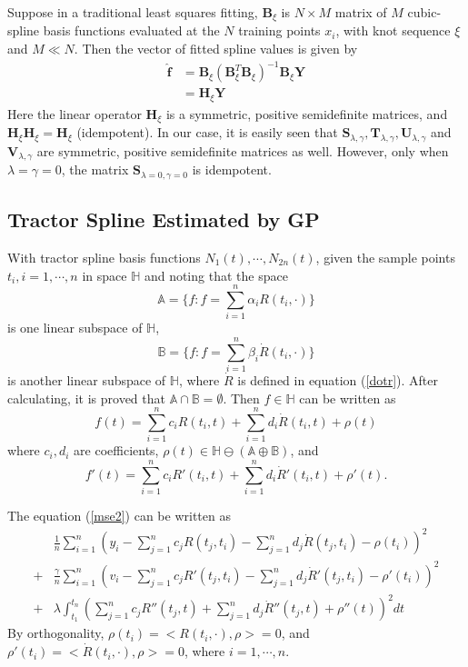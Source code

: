 Suppose in a traditional least squares fitting, $\mathbf{B}_\xi$ is $N \times M$ matrix of $M$ cubic-spline basis functions evaluated at the $N$ training points $x_i$, with knot sequence $\xi$ and $M \ll N$. Then the vector of fitted spline values is given by
\begin{align*}
\hat{\mathbf{f}}&=\mathbf{B}_\xi(\mathbf{B}^T_\xi\mathbf{B}_\xi)^{-1}\mathbf{B}_\xi\mathbf{Y}\\
&=\mathbf{H}_\xi\mathbf{Y}
\end{align*}
Here the linear operator $\mathbf{H}_\xi$ is a symmetric, positive semidefinite matrices, and $\mathbf{H}_\xi\mathbf{H}_\xi=\mathbf{H}_\xi$ (idempotent). In our case, it is easily seen that $\textbf{S}_{\lambda,\gamma}, \textbf{T}_{\lambda,\gamma}, \textbf{U}_{\lambda,\gamma}$ and $\textbf{V}_{\lambda,\gamma}$ are symmetric, positive semidefinite matrices as well. However, only when $\lambda=\gamma=0$, the matrix $\textbf{S}_{\lambda=0,\gamma=0}$ is idempotent.


\subsection{Tractor Spline Estimated by GP}

With tractor spline basis functions $N_1(t), \cdots, N_{2n}(t)$, given the sample points $t_i, i=1, \cdots, n$ in space $\mathbb{H}$ and noting that the space
\begin{equation*}
\mathbb{A}=\{f: f=\sum_{i=1}^{n}\alpha_iR(t_i,\cdot) \} 
\end{equation*}
is one linear subspace of $\mathbb{H}$, 
\begin{equation*}
\mathbb{B}=\{f: f=\sum_{i=1}^{n}\beta_i \dot{R}(t_i,\cdot) \} 
\end{equation*}
is another linear subspace of $\mathbb{H}$, where $\dot{R}$ is defined in equation (\ref{dotr}). After calculating, it is proved that $\mathbb{A} \cap \mathbb{B} = \emptyset$. Then $f \in \mathbb{H}$ can be written as
\begin{equation}\label{etaeq}
f(t)=\sum_{i=1}^{n}c_iR(t_i,t)+\sum_{i=1}^{n}d_i \dot{R}(t_i,t)+\rho(t)
\end{equation}
where $c_i, d_i$ are coefficients, $\rho(t) \in \mathbb{H} \ominus (\mathbb{A} \oplus \mathbb{B})$, and 
\begin{equation}\label{etaeq2}
f'(t)=\sum_{i=1}^{n}c_iR'(t_i,t)+\sum_{i=1}^{n}d_i \dot{R}'(t_i,t)+\rho'(t).
\end{equation}

The equation (\ref{mse2}) can be written as
\begin{align*}
&\frac{1}{n}\sum_{i=1}^n (y_i -\sum_{j=1}^{n}c_jR(t_j,t_i)- \sum_{j=1}^{n}d_j\dot{R}(t_j,t_i) -\rho(t_i))^2\\+&
\frac{\gamma}{n}\sum_{i=1}^n (v_i -\sum_{j=1}^{n}c_jR'(t_j,t_i)- \sum_{j=1}^{n}d_j\dot{R}'(t_j,t_i) -\rho'(t_i))^2 \\
+&\lambda \int_{t_1}^{t_n} (\sum_{j=1}^{n}c_jR''(t_j,t)+ \sum_{j=1}^{n}d_j\dot{R}''(t_j,t) +\rho''(t))^2dt
\end{align*}
By orthogonality, $\rho(t_i) = <R(t_i,\cdot),\rho>=0$, %
and $\rho'(t_i) = <\dot{R}(t_i,\cdot),\rho>=0$, where $i=1,\cdots,n$. 

